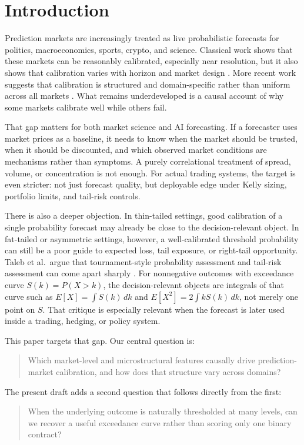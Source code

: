 \documentclass[10pt]{article}
\begin{document}
\section{Introduction}

Prediction markets are increasingly treated as live probabilistic forecasts for
politics, macroeconomics, sports, crypto, and science. Classical work shows
that these markets can be reasonably calibrated, especially near resolution, but
it also shows that calibration varies with horizon and market design
\citep{page2013prediction}. More recent work suggests that calibration is
structured and domain-specific rather than uniform across all markets
\citep{le2026crowd}. What remains underdeveloped is a causal account of why some
markets calibrate well while others fail.

That gap matters for both market science and AI forecasting. If a forecaster
uses market prices as a baseline, it needs to know when the market should be
trusted, when it should be discounted, and which observed market conditions are
mechanisms rather than symptoms. A purely correlational treatment of spread,
volume, or concentration is not enough. For actual trading systems, the target
is even stricter: not just forecast quality, but deployable edge under Kelly
sizing, portfolio limits, and tail-risk controls.

There is also a deeper objection. In thin-tailed settings, good calibration of a
single probability forecast may already be close to the decision-relevant
object. In fat-tailed or asymmetric settings, however, a well-calibrated
threshold probability can still be a poor guide to expected loss, tail
exposure, or right-tail opportunity. Taleb et al.\ argue that tournament-style
probability assessment and tail-risk assessment can come apart sharply
\citep{taleb2023probability}. For nonnegative outcomes with exceedance curve
$S(k)=P(X>k)$, the decision-relevant objects are integrals of that curve such
as $E[X]=\int S(k)\,dk$ and $E[X^2]=2\int kS(k)\,dk$, not merely one point on
$S$. That critique is especially relevant when the forecast is later used
inside a trading, hedging, or policy system.

This paper targets that gap. Our central question is:
\begin{quote}
Which market-level and microstructural features causally drive
prediction-market calibration, and how does that structure vary across
domains?
\end{quote}
The present draft adds a second question that follows directly from the first:
\begin{quote}
When the underlying outcome is naturally thresholded at many levels, can we
recover a useful exceedance curve rather than scoring only one binary contract?
\end{quote}
\end{document}
